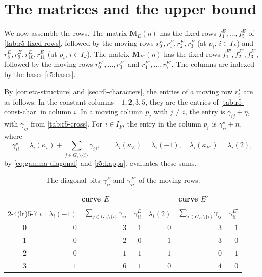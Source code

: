 \section{The matrices and the upper bound}\label{sec:r5-matrices}

We now assemble the rows. The matrix $\mathbf M_E(\eta)$ has the fixed rows $f^E_1,\dots,f^E_5$ of \cref{tab:r5-fixed-rows}, followed by the moving rows $r^E_0,r^E_1,r^E_2,r^E_3$ (at $p_i$, $i\in I_F$) and $r^E_8,r^E_9,r^E_{10},r^E_{11}$ (at $p_i$, $i\in I_J$). The matrix $\mathbf M_{E'}(\eta)$ has the fixed rows $f^{E'}_1,f^{E'}_2,f^{E'}_3$, followed by the moving rows $r^{E'}_0,\dots,r^{E'}_3$ and $r^{E'}_4,\dots,r^{E'}_7$. The columns are indexed by the bases \eqref{r5:bases}.

By \cref{cor:eta-structure} and \cref{sec:r5-characters}, the entries of a moving row $r^\star_i$ are as follows. In the constant columns $-1,2,3,5$, they are the entries of \cref{tab:r5-const-char} in column $i$. In a moving column $p_j$ with $j\ne i$, the entry is $\gamma_{ij}+\eta$, with $\gamma_{ij}$ from \cref{tab:r5-cross}. For $i\in I_F$, the entry in the column $p_i$ is $\gamma^\star_{ii}+\eta$, where
\[
\gamma^\star_{ii}=\lambda_i(\kappa_\star)+\sum_{j\in G_\star\setminus\{i\}}\gamma_{ij},\qquad \lambda_i(\kappa_E)=\lambda_i(-1),\quad\lambda_i(\kappa_{E'})=\lambda_i(2),
\]
by \eqref{eq:gamma-diagonal} and \eqref{r5:kappa}.  evaluates these sums.

\begin{table}[htbp]
\centering
\caption{The diagonal bits $\gamma^E_{ii}$ and $\gamma^{E'}_{ii}$ of the moving rows.}\label{tab:r5-diagonal}
\begin{tabular}{crrrrrr}
\toprule
& \multicolumn{3}{c}{curve $E$} & \multicolumn{3}{c}{curve $E'$}\\
\cmidrule(lr){2-4}\cmidrule(lr){5-7}
$i$ & $\lambda_i(-1)$ & $\sum_{j\in G_E\setminus\{i\}}\gamma_{ij}$ & $\gamma^E_{ii}$ & $\lambda_i(2)$ & $\sum_{j\in G_{E'}\setminus\{i\}}\gamma_{ij}$ & $\gamma^{E'}_{ii}$\\
\midrule
$0$ & $0$ & $3$ & $1$ & $0$ & $3$ & $1$\\
$1$ & $0$ & $2$ & $0$ & $1$ & $3$ & $0$\\
$2$ & $0$ & $1$ & $1$ & $1$ & $0$ & $1$\\
$3$ & $1$ & $6$ & $1$ & $0$ & $4$ & $0$\\
\bottomrule
\end{tabular}
\end{table}

